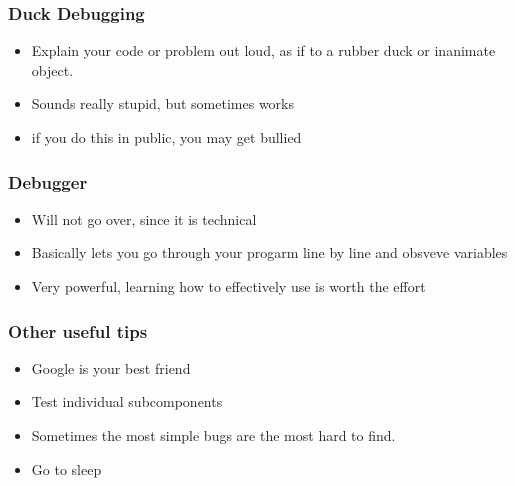 \documentclass[aspectratio=169,hyperref={unicode}]{beamer}
\begin{document}
\begin{frame}
\frametitle{Duck Debugging}
\begin{itemize}
\item Explain your code or problem out loud, as if to a rubber duck or inanimate object.
        \item Sounds really stupid, but sometimes works
        \item if you do this in public, you may get bullied
\end{itemize}
\end{frame}



\begin{frame}
\frametitle{Debugger}
\begin{itemize}
        \item Will not go over, since it is technical
        \item Basically lets you go through your progarm line by line and obsveve variables
        \item Very powerful, learning how to effectively use is worth the effort
\end{itemize}
\end{frame}

\begin{frame}
\frametitle{Other useful tips}
\begin{itemize}
\item Google is your best friend
\item Test individual subcomponents
        \item Sometimes the most simple bugs are the most hard to find.
\item Go to sleep
\end{itemize}
\end{frame}
\end{document}
